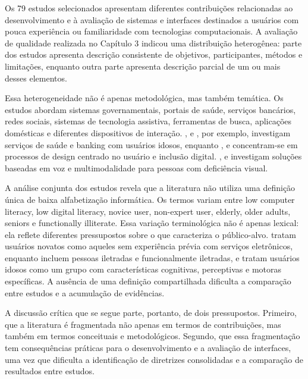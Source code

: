 Os 79 estudos selecionados apresentam diferentes contribuições relacionadas ao desenvolvimento e à avaliação de sistemas e interfaces destinados a usuários com pouca experiência ou familiaridade com tecnologias computacionais. A avaliação de qualidade realizada no Capítulo 3 indicou uma distribuição heterogênea: parte dos estudos apresenta descrição consistente de objetivos, participantes, métodos e limitações, enquanto outra parte apresenta descrição parcial de um ou mais desses elementos.

Essa heterogeneidade não é apenas metodológica, mas também temática. Os estudos abordam sistemas governamentais, portais de saúde, serviços bancários, redes sociais, sistemas de tecnologia assistiva, ferramentas de busca, aplicações domésticas e diferentes dispositivos de interação. \cite{gatsou2017seniors}, \cite{barron2013feasibility} e \cite{xie2010usability}, por exemplo, investigam serviços de saúde e banking com usuários idosos, enquanto \cite{filgueiras2009recoverability}, \cite{balakrishnan2012user} e \cite{kymäläinen2012creating} concentram-se em processos de design centrado no usuário e inclusão digital. \cite{gonzalez2025augmenting}, \cite{ramineni2024enhancing} e \cite{kusumaningayu2017web} investigam soluções baseadas em voz e multimodalidade para pessoas com deficiência visual.

A análise conjunta dos estudos revela que a literatura não utiliza uma definição única de baixa alfabetização informática. Os termos variam entre low computer literacy, low digital literacy, novice user, non-expert user, elderly, older adults, seniors e functionally illiterate. Essa variação terminológica não é apenas lexical: ela reflete diferentes pressupostos sobre o que caracteriza o público-alvo. \cite{nosseir2011novice} tratam usuários novatos como aqueles sem experiência prévia com serviços eletrônicos, enquanto \cite{filgueiras2009recoverability} incluem pessoas iletradas e funcionalmente iletradas, e \cite{kurniawan2005research} tratam usuários idosos como um grupo com características cognitivas, perceptivas e motoras específicas. A ausência de uma definição compartilhada dificulta a comparação entre estudos e a acumulação de evidências.

A discussão crítica que se segue parte, portanto, de dois pressupostos. Primeiro, que a literatura é fragmentada não apenas em termos de contribuições, mas também em termos conceituais e metodológicos. Segundo, que essa fragmentação tem consequências práticas para o desenvolvimento e a avaliação de interfaces, uma vez que dificulta a identificação de diretrizes consolidadas e a comparação de resultados entre estudos.


